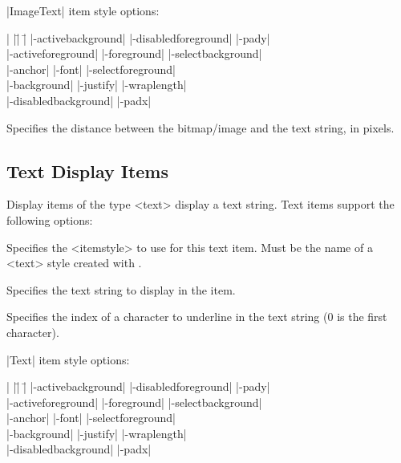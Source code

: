 |ImageText| item style options:

\begin{tabbing}
|                    |\=|                    |\= \kill                    
|-activebackground|       \> |-disabledforeground|  \> |-pady| \\
|-activeforeground|       \> |-foreground|          \> |-selectbackground| \\
|-anchor|	          \> |-font|                \> |-selectforeground| \\         
|-background|	          \> |-justify|             \> |-wraplength| \\         
|-disabledbackground|	  \> |-padx|                \\         
\end{tabbing}

\begin{enum}{1cm}
Specifies the distance between the bitmap/image and the text string,
in pixels.
\end{enum}

\subsection*{Text Display Items}
Display items of the type <text> display a text string.
Text items support the following options:

\begin{enum}{1cm}
Specifies the <itemstyle> to use for this text item. Must be the
name of a <text> style created with .

Specifies the text string to display in the item.

Specifies the index of a character to underline in the text
string (0 is the first character).
\end{enum}

|Text| item style options:

\begin{tabbing}
|                    |\=|                    |\= \kill                    
|-activebackground|       \> |-disabledforeground|  \> |-pady| \\
|-activeforeground|       \> |-foreground|          \> |-selectbackground| \\
|-anchor|	          \> |-font|                \> |-selectforeground| \\         
|-background|	          \> |-justify|             \> |-wraplength| \\         
|-disabledbackground|	  \> |-padx|                \\         
\end{tabbing}

